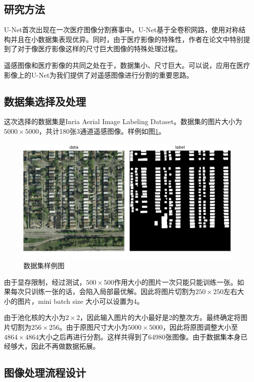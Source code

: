\begin{spacing}{2}
    \section{研究方法}
\end{spacing}
U-Net首次出现在一次医疗图像分割赛事中。U-Net基于全卷积网路，使用对称结构并且在小数据集表现优异。同时，由于医疗影像的特殊性，作者在论文中特别提到了对于像医疗影像这样的尺寸巨大图像的特殊处理过程。

遥感图像和医疗影像的共同之处在于，数据集小、尺寸巨大。可以说，应用在医疗影像上的U-Net为我们提供了对遥感图像进行分割的重要思路。
\subsection{数据集选择及处理}
这次选择的数据集是Inria Aerial Image Labeling Dataset\cite{maggiori2017dataset}。数据集的图片大小为$5000\times 5000$，共计180张3通道遥感图像。样例如图\ref{Fig:sample_dataset}。

\begin{figure}[!t]
		\centering
		\includegraphics[width=1\textwidth]{Figures/sample_dataset.png}
		\caption{数据集样例图}
		\label{Fig:sample_dataset}
\end{figure}

由于显存限制，经过测试，$500\times 500$作用大小的图片一次只能只能训练一张。如果每次只训练一张的话，会陷入局部最优解。因此将图片切割为$250\times 250$左右大小的图片，mini batch size 大小可以设置为4。

由于池化核的大小为$2\times 2$，因此输入图片的大小最好是2的整次方。最终确定将图片切割为$256\times 256$。由于原图尺寸大小为$5000\times 5000$，因此将原图调整大小至$4864\times 4864$大小之后再进行分割。这样共得到了64980张图像。由于数据集本身已经够大，因此不再做数据拓展。
\subsection{图像处理流程设计}
